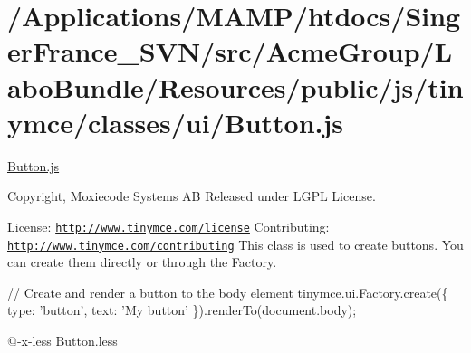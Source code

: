 \hypertarget{_2_applications_2_m_a_m_p_2htdocs_2_singer_france__s_v_n_2src_2_acme_group_2_labo_bundle_2_resouf56f6ca625fb2e1a9f8c21608ca6bf55}{\section{/\+Applications/\+M\+A\+M\+P/htdocs/\+Singer\+France\+\_\+\+S\+V\+N/src/\+Acme\+Group/\+Labo\+Bundle/\+Resources/public/js/tinymce/classes/ui/\+Button.\+js}
}
\hyperlink{_button_8js}{Button.\+js}

Copyright, Moxiecode Systems A\+B Released under L\+G\+P\+L License.

License\+: \href{http://www.tinymce.com/license}{\tt http\+://www.\+tinymce.\+com/license} Contributing\+: \href{http://www.tinymce.com/contributing}{\tt http\+://www.\+tinymce.\+com/contributing} This class is used to create buttons. You can create them directly or through the Factory.

// Create and render a button to the body element tinymce.\+ui.\+Factory.\+create(\{ type\+: 'button', text\+: 'My button' \}).render\+To(document.\+body);

@-\/x-\/less Button.\+less


\begin{DoxyCodeInclude}
\end{DoxyCodeInclude}
 
